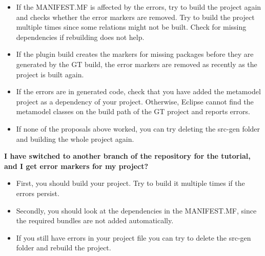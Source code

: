 \begin{itemize}

    \item If the MANIFEST.MF is affected by the errors, try to build the project again and checks whether the error markers are removed. Try to build the project multiple times since some relations might not be built. Check for missing dependencies if rebuilding does not help. 
    
    \item If the plugin build creates the markers for missing packages before they are generated by the GT build, the error markers are removed as recently as the project is built again.
    
    \item If the errors are in generated code, check that you have added the metamodel project as a dependency of your project. Otherwise, Eclipse cannot find the metamodel classes on the build path of the GT project and reports errors.
    
    \item If none of the proposals above worked, you can try deleting the src-gen folder and building the whole project again. \newline

\end{itemize}

\textbf{I have switched to another branch of the repository for the tutorial, and I get error markers for my project?}

\begin{itemize}

    \item First, you should build your project. Try to build it multiple times if the errors persist.
    
    \item Secondly, you should look at the dependencies in the MANIFEST.MF, since the required bundles are not added automatically.
    
    \item If you still have errors in your project file you can try to delete the src-gen folder and rebuild the project.

\end{itemize}

\clearpage